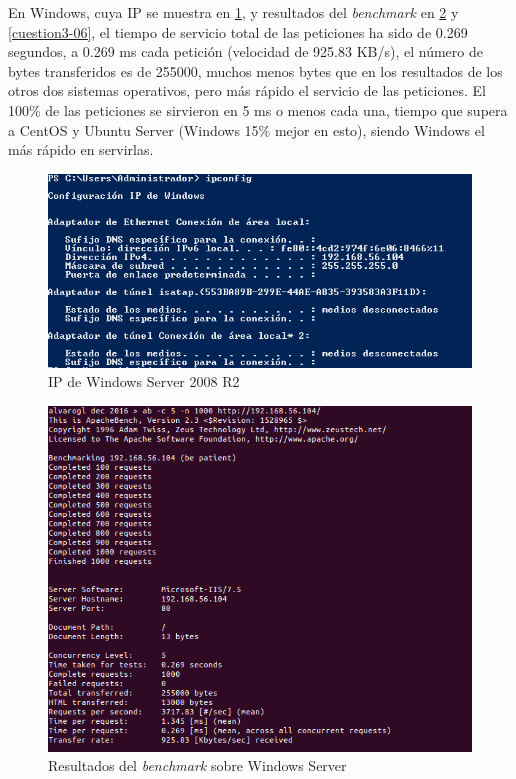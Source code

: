 En Windows, cuya IP se muestra en \ref{cuestion3-04}, y resultados del \textit{benchmark} en \ref{cuestion3-05} y \ref{cuestion3-06}, el tiempo de servicio total de las peticiones ha sido de 0.269 segundos, a 0.269 ms cada petición (velocidad de 925.83 KB/s), el número de bytes transferidos es de 255000, muchos menos bytes que en los resultados de los otros dos sistemas operativos, pero más rápido el servicio de las peticiones. El 100\% de las peticiones se sirvieron en 5 ms o menos cada una, tiempo que supera a CentOS y Ubuntu Server (Windows 15\% mejor en esto), siendo Windows el más rápido en servirlas.

\begin{figure}[H]
	\centering
	\includegraphics[scale=0.6]{cuestion3-04.png}
	\caption{IP de Windows Server 2008 R2} \label{cuestion3-04}
\end{figure}

\begin{figure}[H]
	\centering
	\includegraphics[scale=0.6]{cuestion3-05.png}
	\caption{Resultados del \textit{benchmark} sobre Windows Server} \label{cuestion3-05}
\end{figure}

